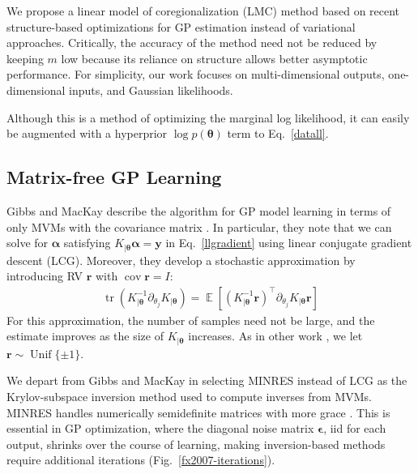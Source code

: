 \documentclass{article}
\def\bsa{{\boldsymbol\alpha}}
\def\bse{{\boldsymbol\epsilon}}
\def\bsth{{\boldsymbol\theta}}
\newcommand{\pa}[1]{ \left({#1}\right) }
\def\Ty{\textbf{y}}
\def\tbr{\textbf{r}}
\DeclareMathOperator\cov{cov}
\DeclareMathOperator\Unif{Unif}
\DeclareMathOperator\mathExp{\mathbb{E}}
\def \E {\mathExp}
\DeclareMathOperator{\Tr}{tr}
\begin{document}
We propose a linear model of coregionalization (LMC) method based on recent structure-based optimizations for GP estimation instead of variational approaches. Critically, the accuracy of the method need not be reduced by keeping $m$ low because its reliance on structure allows better asymptotic performance.
For simplicity, our work focuses on multi-dimensional outputs, one-dimensional inputs, and Gaussian likelihoods.

Although this is a method of optimizing the marginal log likelihood, it can easily be augmented with a hyperprior $\log p(\bsth)$ term to Eq.~\ref{datall}.%

\subsection{Matrix-free GP Learning}

Gibbs and MacKay describe the algorithm for GP model learning in terms of only MVMs with the covariance matrix . In particular, they note that we can solve for $\bsa$ satisfying $K_{|\bsth}\bsa=\Ty$ in Eq.~\ref{llgradient} using linear conjugate gradient descent (LCG). Moreover, they develop a stochastic approximation by introducing RV $\tbr$ with $\cov \tbr=I$:
\begin{align}
  \Tr\pa{K_{|\bsth}^{-1}\partial_{\theta_j}K_{|\bsth}} = \E\left[(K_{|\bsth}^{-1}\tbr)^\top\partial_{\theta_j}K_{|\bsth}\tbr\right]\label{eq:trace}
\end{align}
For this approximation, the number of samples need not be large, and the estimate improves as the size of $K_{|\bsth}$ increases.
As in other work \cite{cutajar2016preconditioning}, we let $\tbr\sim\Unif\{\pm 1\}$.

We depart from Gibbs and MacKay in selecting MINRES instead of LCG as the Krylov-subspace inversion method used to compute inverses from MVMs. MINRES handles numerically semidefinite matrices with more grace \cite{fong2012cg}. This is essential in GP optimization, where the diagonal noise matrix $\bse$, iid for each output, shrinks over the course of learning, making inversion-based methods require additional iterations (Fig.~\ref{fx2007-iterations}).
\end{document}
